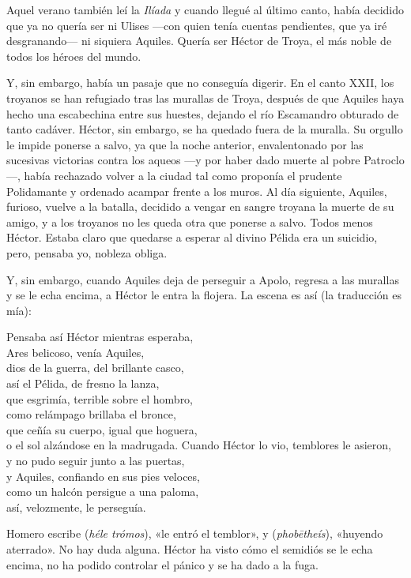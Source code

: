 Aquel verano también leí la \emph{Ilíada} y cuando llegué al último canto, había decidido que ya no quería ser ni Ulises ---con quien tenía cuentas pendientes, que ya iré desgranando--- ni siquiera Aquiles. Quería ser Héctor de Troya, el más noble de todos los héroes del mundo.

Y, sin embargo, había un pasaje que no conseguía digerir. En el canto XXII, los troyanos se han refugiado tras las murallas de Troya, después de que Aquiles haya hecho una escabechina entre sus huestes, dejando el río Escamandro obturado de tanto cadáver. Héctor, sin embargo, se ha quedado fuera de la muralla. Su orgullo le impide ponerse a salvo, ya que la noche anterior, envalentonado por las sucesivas victorias contra los aqueos ---y por haber dado muerte al pobre Patroclo---, había rechazado volver a la ciudad tal como proponía el prudente Polidamante y ordenado acampar frente a los muros. Al día siguiente, Aquiles, furioso, vuelve a la batalla, decidido a vengar en sangre troyana la muerte de su amigo, y a los troyanos no les queda otra que ponerse a salvo. Todos menos Héctor. Estaba claro que quedarse a esperar al divino Pélida era un suicidio, pero, pensaba yo, nobleza obliga.

Y, sin embargo, cuando Aquiles deja de perseguir a Apolo, regresa a las murallas y se le echa encima, a Héctor le entra la flojera. La escena es así (la traducción es mía):

\begin{versocita}
Pensaba así Héctor mientras esperaba,\\
Ares belicoso, venía Aquiles,\\
dios de la guerra, del brillante casco,\\
así el Pélida, de fresno la lanza,\\
que esgrimía, terrible sobre el hombro,\\
como relámpago brillaba el bronce,\\
que ceñía su cuerpo, igual que hoguera,\\
o el sol alzándose en la madrugada.
\stanzabreak
Cuando Héctor lo vio, temblores le asieron,\\
y no pudo seguir junto a las puertas,\\
y Aquiles, confiando en sus pies veloces,\\
como un halcón persigue a una paloma,\\
así, velozmente, le perseguía.
\end{versocita}

Homero escribe  (\emph{héle trómos}), «le entró el temblor», y  (\emph{phobētheís}), «huyendo aterrado». No hay duda alguna. Héctor ha visto cómo el semidiós se le echa encima, no ha podido controlar el pánico y se ha dado a la fuga.

